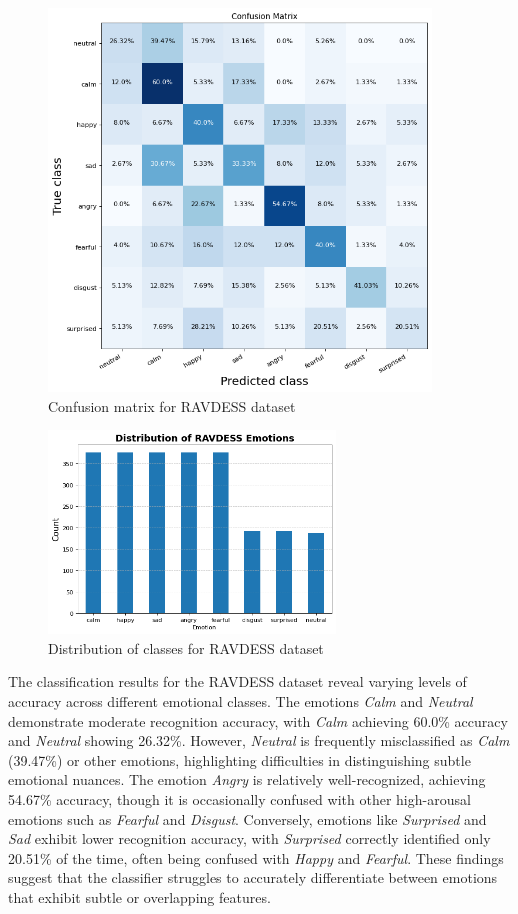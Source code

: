 \begin{figure}[H]
  \centering
  \includegraphics[width = 4in, keepaspectratio]{figures/CM_RAVDESS.png}
  \caption{Confusion matrix for RAVDESS dataset}
  \label{conf_matrix_rav}
\end{figure}

\begin{figure}[H]
  \centering
  \includegraphics[width = 3in, keepaspectratio]{figures/Count Plot - RAVDESS.png}
  \caption{Distribution of classes for RAVDESS dataset}
  \label{dist_rav}
\end{figure}

The classification results for the RAVDESS dataset reveal varying levels of accuracy across different emotional classes. The emotions \textit{Calm} and \textit{Neutral} demonstrate moderate recognition accuracy, with \textit{Calm} achieving 60.0\% accuracy and \textit{Neutral} showing 26.32\%. However, \textit{Neutral} is frequently misclassified as \textit{Calm} (39.47\%) or other emotions, highlighting difficulties in distinguishing subtle emotional nuances. The emotion \textit{Angry} is relatively well-recognized, achieving 54.67\% accuracy, though it is occasionally confused with other high-arousal emotions such as \textit{Fearful} and \textit{Disgust}. Conversely, emotions like \textit{Surprised} and \textit{Sad} exhibit lower recognition accuracy, with \textit{Surprised} correctly identified only 20.51\% of the time, often being confused with \textit{Happy} and \textit{Fearful}. These findings suggest that the classifier struggles to accurately differentiate between emotions that exhibit subtle or overlapping features.

